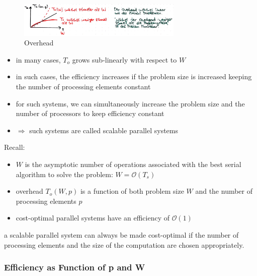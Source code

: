 \begin{figure}[H]
\centering
\includegraphics[width=0.7\textwidth]{figures/overhead.png}
\caption{Overhead}
\end{figure}

\begin{itemize}
\tightlist
\item
  in many cases, $T_o$ grows sub-linearly with respect to $W$
\item
  in such cases, the efficiency increases if the problem size is
  increased keeping the number of processing elements constant
\item
  for such systems, we can simultaneously increase the problem size and
  the number of processors to keep efficiency constant
\item
  $\Rightarrow$ such systems are called scalable parallel systems
\end{itemize}

Recall:

\begin{itemize}
\tightlist
\item
  $W$ is the asymptotic number of operations associated with the best
  serial algorithm to solve the problem: $W = \mathcal{O}(T_s)$
\item
  overhead $T_o (W, p)$ is a function of both problem size $W$ and the
  number of processing elements $p$
\item
  cost-optimal parallel systems have an efficiency of $\mathcal{O}(1)$
\end{itemize}

\begin{tcolorbox}[colback=red!5!white,colframe=red!75!black]
a scalable parallel system can always be made cost-optimal if the number of processing elements and the size of the computation are chosen appropriately. 
\end{tcolorbox}

\hypertarget{efficiency-as-function-of-p-and-w}{%
\subsubsection{Efficiency as Function of p and
W}\label{efficiency-as-function-of-p-and-w}}

